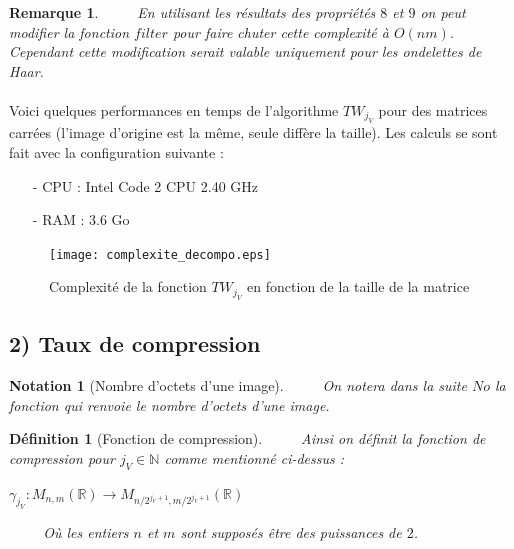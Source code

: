 \documentclass[a4paper,10pt]{report}
\theoremstyle{break}
\newtheorem{Def}{D\'{e}finition}
\newtheorem{Rem}{Remarque}
\newtheorem{Nota}{Notation}
\begin{document}
    \begin{Rem}
      $\phantom{Prop}$ En utilisant les r\'{e}sultats des propri\'{e}t\'{e}s $8$ et $9$ on peut modifier la fonction $filter$ 
      pour faire chuter cette complexit\'{e} \`{a} $ O(nm) $. Cependant cette modification serait valable uniquement pour les
      ondelettes de Haar.
    \end{Rem}

    \paragraph{} Voici quelques performances en temps de l'algorithme $TW_{j_V}$ pour des matrices carr\'{e}es 
      (l'image d'origine est la m\^{e}me, seule diff\`{e}re la taille). 
      Les calculs se sont fait avec la configuration suivante :
      \begin{itemize}
       \item[-] CPU : Intel Code 2 CPU 2.40 GHz
       \item[-] RAM : 3.6 Go
      \end{itemize}

\newpage
    
    \begin{figure}[!h]
	\centering
	
	\texttt{[image: complexite\_decompo.eps]}
	
	\caption{Complexit\'{e} de la fonction $TW_{j_V}$ en fonction de la taille de la matrice }
    \end{figure}

  \subsection*{2) Taux de compression}
  
    \begin{Nota}[Nombre d'octets d'une image]
      $\phantom{Prop}$ On notera dans la suite $No$ la fonction qui renvoie le nombre d'octets d'une image.
    \end{Nota}
    
    \begin{Def}[Fonction de compression]
      $\phantom{Prop}$ Ainsi on d\'{e}finit la fonction de compression pour $j_V \in \mathbb{N}$ comme mentionn\'{e} ci-dessus :
      \begin{center}
	$ \gamma_{j_V} : M_{n, m}(\mathbb{R}) \longrightarrow M_{n / 2^{j_V + 1}, m / 2^{j_V + 1}}(\mathbb{R}) $
      \end{center}
      $\phantom{Prop}$ O\`{u} les entiers $n$ et $m$ sont suppos\'{e}s \^{e}tre des puissances de $2$.
    \end{Def}
  
\end{document}
